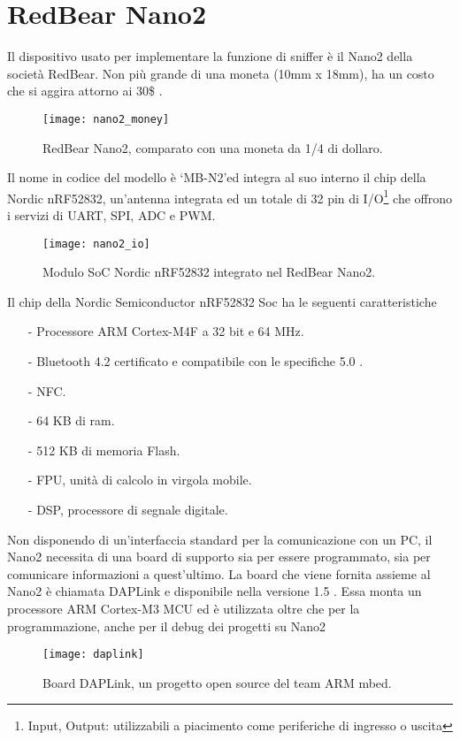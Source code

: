 
\section{RedBear Nano2}
Il dispositivo usato per implementare la funzione di sniffer è il Nano2 della società RedBear. Non più grande di una moneta (10mm x 18mm), ha un costo che si aggira attorno ai 30\$ .

\begin{figure}[H]
\texttt{[image: nano2\_money]}
\centering
\caption{RedBear Nano2, comparato con una moneta da 1/4 di dollaro.}
\end{figure}

Il nome in codice del modello è \lq MB-N2\rq ed integra al suo interno il chip della Nordic nRF52832, un'antenna integrata ed un totale di 32 pin di I/O\footnote{Input, Output: utilizzabili a piacimento come periferiche di ingresso o uscita} che offrono i servizi di UART, SPI, ADC e PWM.

\begin{figure}[H]
\texttt{[image: nano2\_io]}
\centering
\caption{Modulo SoC Nordic nRF52832 integrato nel RedBear Nano2.}
\end{figure}

\begin{samepage}
Il chip della Nordic Semiconductor nRF52832 Soc ha le seguenti caratteristiche
\begin{itemize}
\item[-] Processore ARM Cortex-M4F a 32 bit e 64 MHz.
\item[-] Bluetooth 4.2 certificato e compatibile con le specifiche 5.0 .
\item[-] NFC.
\item[-] 64 KB di ram.
\item[-] 512 KB di memoria Flash.
\item[-] FPU, unità di calcolo in virgola mobile.
\item[-] DSP, processore di segnale digitale.
\end{itemize}
\end{samepage}

Non disponendo di un'interfaccia standard per la comunicazione con un PC, il Nano2 necessita di una board di supporto sia per essere programmato, sia per comunicare informazioni a quest'ultimo.
La board che viene fornita assieme al Nano2 è chiamata DAPLink e disponibile nella versione 1.5 . Essa monta un processore ARM Cortex-M3 MCU ed è utilizzata oltre che per la programmazione, anche per il debug dei progetti su Nano2

\begin{figure}[H]
\texttt{[image: daplink]}
\centering
\caption{Board DAPLink, un progetto open source del team ARM mbed.}
\end{figure}


